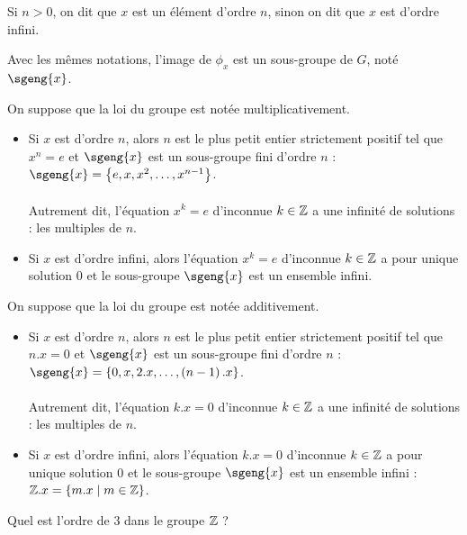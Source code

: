 Si \(n>0\), on dit que \(x\) est un élément d'ordre \(n\), sinon on dit que \(x\) est d'ordre infini.

Avec les mêmes notations, l'image de \(\phi_x\) est un sous-groupe de \(G\), noté \(\sgeng{x}\).

\begin{prop}
On suppose que la loi du groupe est notée multiplicativement.

\begin{itemize}
    \item Si \(x\) est d'ordre \(n\), alors \(n\) est le plus petit entier strictement positif tel que \(x^n=e\) et \(\sgeng{x}\) est un sous-groupe fini d'ordre \(n\) : \(\sgeng{x}=\accol{e,x,x^2,\dots,x^{n-1}}\). \\\\ Autrement dit, l'équation \(x^k=e\) d'inconnue \(k\in\mathbb{Z}\) a une infinité de solutions : les multiples de \(n\). \\
    \item Si \(x\) est d'ordre infini, alors l'équation \(x^k=e\) d'inconnue \(k\in\mathbb{Z}\) a pour unique solution \(0\) et le sous-groupe \(\sgeng{x}\) est un ensemble infini.
\end{itemize}
\end{prop}

\begin{prop}
On suppose que la loi du groupe est notée additivement.

\begin{itemize}
    \item Si \(x\) est d'ordre \(n\), alors \(n\) est le plus petit entier strictement positif tel que \(n.x=0\) et \(\sgeng{x}\) est un sous-groupe fini d'ordre \(n\) : \(\sgeng{x}=\accol{0,x,2.x,\dots,\paren{n-1}.x}\). \\\\ Autrement dit, l'équation \(k.x=0\) d'inconnue \(k\in\mathbb{Z}\) a une infinité de solutions : les multiples de \(n\). \\
    \item Si \(x\) est d'ordre infini, alors l'équation \(k.x=0\) d'inconnue \(k\in\mathbb{Z}\) a pour unique solution \(0\) et le sous-groupe \(\sgeng{x}\) est un ensemble infini : \(\mathbb{Z}.x=\left\lbrace m.x\;\middle|\; m\in\mathbb{Z}\right\rbrace\).
\end{itemize}
\end{prop}

\begin{exo}
Quel est l'ordre de \(3\) dans le groupe \(\mathbb{Z}\) ?
\end{exo}

